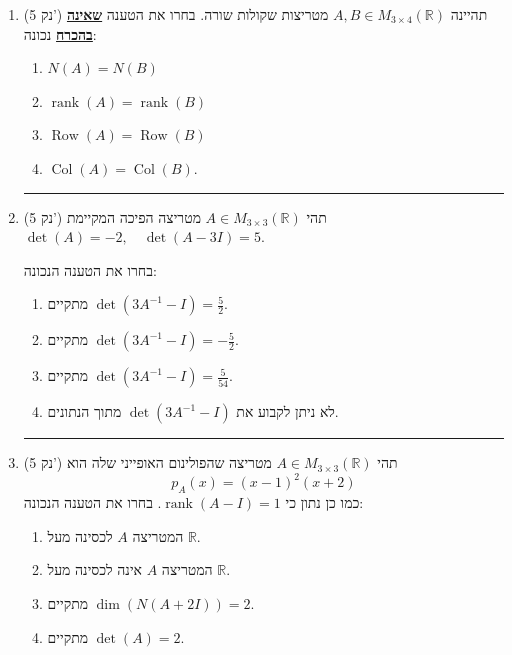 \documentclass[12pt, a4paper]{article}
\newcommand{\rr}{\mathbb{R}}
\DeclareMathOperator{\rank}{rank}
\newcommand{\points}[1]{(#1 נק') }
\DeclareMathOperator{\row}{Row}
\DeclareMathOperator{\col}{Col}
\begin{document}
\begin{enumerate}
\begin{enumerate}
\end{enumerate}

\noindent\rule{16cm}{0.4pt}

\item\points{5}
תהיינה
$A,B\in M_{3\times 4}(\rr)$
מטריצות שקולות שורה.
בחרו את הטענה
\underline{
\textbf{שאינה בהכרח}}
נכונה:
\begin{enumerate}
\item
$N(A)=N(B)$

\item
$\rank(A)=\rank(B)$

\item
$\row(A)=\row(B)$

\item
$\col(A)=\col(B)$.

\end{enumerate}


\noindent\rule{16cm}{0.4pt}

\item\points{5}
תהי
$A\in M_{3\times 3}(\rr)$
מטריצה הפיכה המקיימת
$\det(A)=-2, \quad \det(A-3I)=5$.

בחרו את הטענה הנכונה:
\begin{enumerate}
\item
מתקיים
$\det(3A^{-1}-I)=\frac{5}{2}$.

\item
מתקיים
$\det(3A^{-1}-I)=-\frac{5}{2}$.

\item
מתקיים
$\det(3A^{-1}-I)=\frac{5}{54}$.

\item
לא ניתן לקבוע את
$\det(3A^{-1}-I)$
מתוך הנתונים.
\end{enumerate}

\noindent\rule{16cm}{0.4pt}


\item\points{5}
תהי
$A\in M_{3\times 3}(\rr)$
מטריצה שהפולינום האופייני שלה הוא
$$p_A(x)=(x-1)^2(x+2)$$
כמו כן נתון כי
$\rank(A-I)=1$.
בחרו את הטענה הנכונה:
\begin{enumerate}
\item
המטריצה
$A$
לכסינה מעל
$\rr$.

\item
המטריצה
$A$
אינה לכסינה מעל
$\rr$.

\item
מתקיים
$\dim(N(A+2I))=2$.

\item
מתקיים
$\det(A)=2$.
\end{enumerate}


\pagebreak

\end{enumerate}
\end{document}
